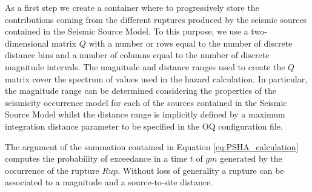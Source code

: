 As a first step we create a container where to progressively store the contributions coming from the different ruptures produced by the seismic sources contained in the Seismic Source Model.
%
To this purpose, we use a two-dimensional matrix $Q$ with a number or rows equal to the number of discrete distance bins and a number of columns equal to the number of discrete magnitude intervals. The magnitude and distance ranges used to create the $Q$ matrix cover the spectrum of values used in the hazard calculation. In particular, the magnitude range can be determined considering the properties of the seismicity occurrence model for each of the sources contained in the Seismic Source Model whilst the distance range is implicitly defined by a maximum integration distance parameter to be specified in the OQ configuration file. 
%

The argument of the summation contained in Equation \ref{eq:PSHA_calculation} computes the probability of exceedance in a time $t$ of $gm$ generated by the occurrence of the rupture $Rup$. Without loss of generality a rupture can be associated to a magnitude and a source-to-site distance.



